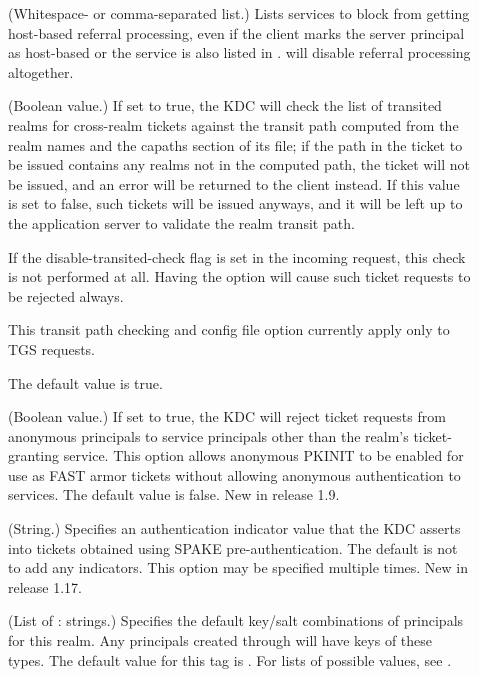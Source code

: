 \documentclass[letterpaper,10pt,english]{sphinxmanual}
\begin{document}
\begin{description}
\item[{}] \leavevmode
(Whitespace- or comma-separated list.)  Lists services to block
from getting host-based referral processing, even if the client
marks the server principal as host-based or the service is also
listed in .   will
disable referral processing altogether.

\item[{}] \leavevmode
(Boolean value.)  If set to true, the KDC will check the list of
transited realms for cross-realm tickets against the transit path
computed from the realm names and the capaths section of its
{\hyperref[\detokenize{admin/conf_files/krb5_conf:krb5-conf-5}]{}} file; if the path in the ticket to be issued
contains any realms not in the computed path, the ticket will not
be issued, and an error will be returned to the client instead.
If this value is set to false, such tickets will be issued
anyways, and it will be left up to the application server to
validate the realm transit path.

If the disable-transited-check flag is set in the incoming
request, this check is not performed at all.  Having the
 option will cause such ticket requests to
be rejected always.

This transit path checking and config file option currently apply
only to TGS requests.

The default value is true.

\item[{}] \leavevmode
(Boolean value.)  If set to true, the KDC will reject ticket
requests from anonymous principals to service principals other
than the realm’s ticket-granting service.  This option allows
anonymous PKINIT to be enabled for use as FAST armor tickets
without allowing anonymous authentication to services.  The
default value is false.  New in release 1.9.

\item[{}] \leavevmode
(String.)  Specifies an authentication indicator value that the
KDC asserts into tickets obtained using SPAKE pre-authentication.
The default is not to add any indicators.  This option may be
specified multiple times.  New in release 1.17.

\item[{}] \leavevmode
(List of : strings.)  Specifies the default key/salt
combinations of principals for this realm.  Any principals created
through {\hyperref[\detokenize{admin/admin_commands/kadmin_local:kadmin-1}]{}} will have keys of these types.  The
default value for this tag is .  For lists of
possible values, see {\hyperref[\detokenize{admin/conf_files/kdc_conf:keysalt-lists}]{}}.


\end{description}
\end{document}

